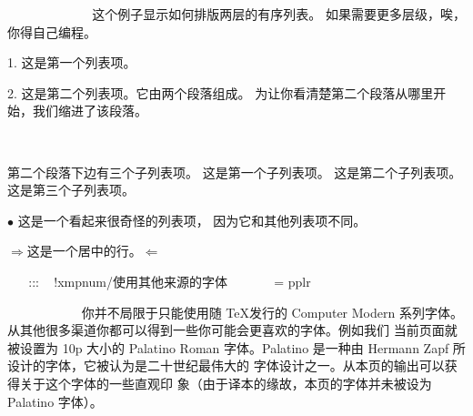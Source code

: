 ~%
~%
~%
~%
~%
~%
~%
~%
这个例子显示如何排版两层的有序列表。
如果需要更多层级，唉，你得自己编程。
\smallskip
\item {1.} 这是第一个列表项。
\item {2.} 这是第二个列表项。它由两个段落组成。
为让你看清楚第二个段落从哪里开始，我们缩进了该段落。

~%
~%
~%
~%
~%
~%
~%
\item{} \indent 第二个段落下边有三个子列表项。
 这是第一个子列表项。
 这是第二个子列表项。
 这是第三个子列表项。
\item {$\bullet$} 这是一个看起来很奇怪的列表项，
因为它和其他列表项不同。
\smallskip
~%
~%
~%
\centerline{$\Rightarrow$这是一个居中的行。$\Leftarrow$}
~%
~%
\bye %
:::
~%
\xmpheader !xmpnum/{使用其他来源的字体}%
~
~
~
~ 
\font\tenrm = pplr %
\def\pal{\let\rm = \tenrm \baselineskip=12.5pt \rm}
\pal %

~%
~%
~%
~%
~%
~%
~%
你并不局限于只能使用随 \TeX 发行的 Computer Modern 系列字体。
从其他很多渠道你都可以得到一些你可能会更喜欢的字体。例如我们
当前页面就被设置为 10p 大小的 Palatino Roman 字体。Palatino
是一种由 Hermann Zapf 所设计的字体，它被认为是二十世纪最伟大的
字体设计之一。从本页的输出可以获得关于这个字体的一些直观印
象（由于译本的缘故，本页的字体并未被设为 Palatino 字体）。

